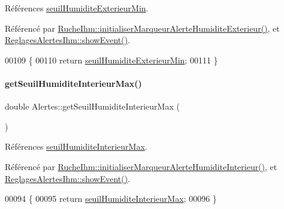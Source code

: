 Références \hyperlink{class_alertes_a18afbc02513a6e4fa8baa665092719c9}{seuil\+Humidite\+Exterieur\+Min}.



Référencé par \hyperlink{class_ruche_ihm_ae572f3f2b76e8c9b14a699d3e29422ee}{Ruche\+Ihm\+::initialiser\+Marqueur\+Alerte\+Humidite\+Exterieur()}, et \hyperlink{class_reglages_alertes_ihm_af47504b34ab0213fce9269c08b9e5544}{Reglages\+Alertes\+Ihm\+::show\+Event()}.


\begin{DoxyCode}
00109 \{
00110     \textcolor{keywordflow}{return} \hyperlink{class_alertes_a18afbc02513a6e4fa8baa665092719c9}{seuilHumiditeExterieurMin};
00111 \}
\end{DoxyCode}
\mbox{\label{class_alertes_a86e0bb83ac1fa5e704e3b7b3fc7147cd}} 
\paragraph{\texorpdfstring{get\+Seuil\+Humidite\+Interieur\+Max()}{getSeuilHumiditeInterieurMax()}}
{\footnotesize\ttfamily double Alertes\+::get\+Seuil\+Humidite\+Interieur\+Max (\begin{DoxyParamCaption}{ }\end{DoxyParamCaption})}



Références \hyperlink{class_alertes_a795cd3721854335f6c91e6009b324c37}{seuil\+Humidite\+Interieur\+Max}.



Référencé par \hyperlink{class_ruche_ihm_a42785d6da8aca09d8becb6d500de8d9f}{Ruche\+Ihm\+::initialiser\+Marqueur\+Alerte\+Humidite\+Interieur()}, et \hyperlink{class_reglages_alertes_ihm_af47504b34ab0213fce9269c08b9e5544}{Reglages\+Alertes\+Ihm\+::show\+Event()}.


\begin{DoxyCode}
00094 \{
00095     \textcolor{keywordflow}{return} \hyperlink{class_alertes_a795cd3721854335f6c91e6009b324c37}{seuilHumiditeInterieurMax};
00096 \}
\end{DoxyCode}
\mbox{\label{class_alertes_a40d47b65952035b78cac05b915ad57b8}} 

